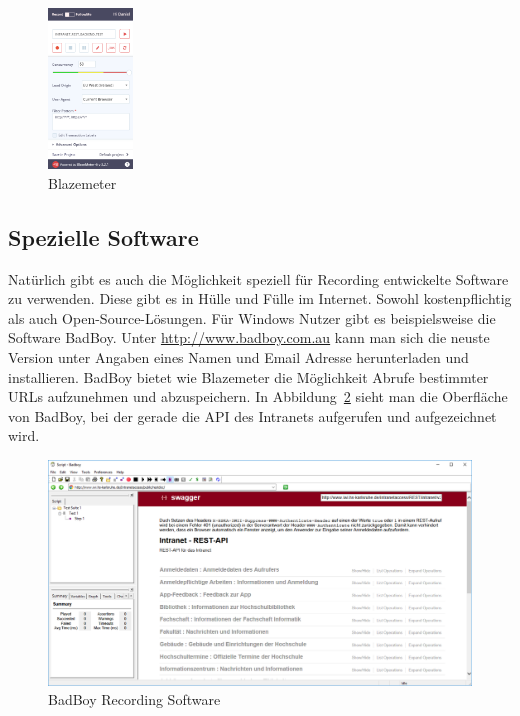 \documentclass[a4paper,12pt]{article}
\begin{document}
\begin{figure}[htb]%
 \centering
    \includegraphics[width=0.2\textwidth]{bilder/blazemeter.png}
  \caption{Blazemeter}
  \label{fig:blazemeter}
\end{figure}

\subsection{Spezielle Software}
Natürlich gibt es auch die Möglichkeit speziell für Recording entwickelte Software zu verwenden. Diese gibt es in Hülle und Fülle im Internet. Sowohl kostenpflichtig als auch Open-Source-Lösungen. Für Windows Nutzer gibt es beispielsweise die Software BadBoy. Unter \url{http://www.badboy.com.au} kann man sich die neuste Version unter Angaben eines Namen und Email Adresse herunterladen und installieren. BadBoy bietet wie Blazemeter die Möglichkeit Abrufe bestimmter URLs aufzunehmen und abzuspeichern. In Abbildung~\ref{fig:badboy} sieht man die Oberfläche von BadBoy, bei der gerade die API des Intranets aufgerufen und aufgezeichnet wird. 

\begin{figure}[htb]%
 \centering
    \includegraphics[width=1\textwidth]{bilder/badboy.png}
  \caption{BadBoy Recording Software}
  \label{fig:badboy}
\end{figure}
\end{document}
